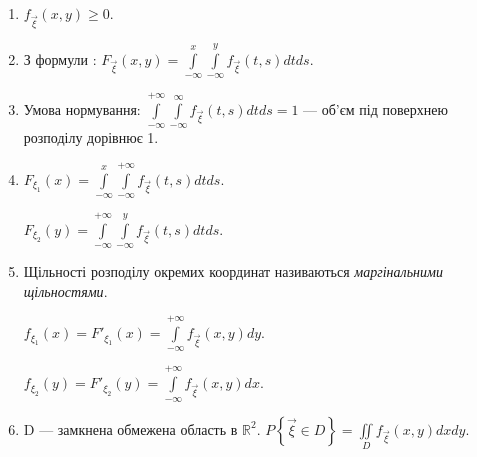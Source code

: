 \begin{enumerate}
    \item $f_{\vec{\xi}}(x, y) \geq 0$.
    \item З формули : $F_{\vec{\xi}}(x, y) 
    = \int\limits_{-\infty}^x \int\limits_{-\infty}^y f_{\vec{\xi}}(t, s) 
    dt ds $.
    \item Умова нормування: 
    $\int\limits_{-\infty}^{+\infty} \int\limits_{-\infty}^{\infty} f_{\vec{\xi}}(t, s) 
    dt ds = 1$ --- об'єм під поверхнею розподілу 
    дорівнює 1.
    \item $F_{\xi_1}(x) = \int\limits_{-\infty}^{x} \int\limits_{-\infty}^{+\infty} 
    f_{\vec{\xi}}(t, s) dt ds$.

    $F_{\xi_2}(y) = \int\limits_{-\infty}^{+\infty} \int\limits_{-\infty}^{y} 
    f_{\vec{\xi}}(t, s) dt ds$.
    \item Щільності розподілу окремих координат називаються 
    \emph{маргінальними щільностями}.

    $f_{\xi_1}(x) = F'_{\xi_1}(x) 
    = \int\limits_{-\infty}^{+\infty} f_{\vec{\xi}}(x, y) dy $.

    $f_{\xi_2}(y) = F'_{\xi_2}(y) 
    = \int\limits_{-\infty}^{+\infty} f_{\vec{\xi}}(x, y) dx $.
    
    \item D --- замкнена обмежена область в $\mathbb{R}^2$.
    $P\left\{ \vec{\xi} \in D \right\} = \iint\limits_D f_{\vec{\xi}}(x, y) 
    dx dy$.
\end{enumerate}

